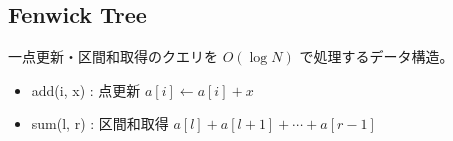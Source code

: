 \subsection{Fenwick Tree}
一点更新・区間和取得のクエリを $O(\log N)$ で処理するデータ構造。
\begin{itemize}
    \item add(i, x) : 点更新 $a[i] \xleftarrow{} a[i] + x$
    \item sum(l, r) : 区間和取得 $a[l] + a[l + 1] + \cdots + a[r - 1]$
\end{itemize}

